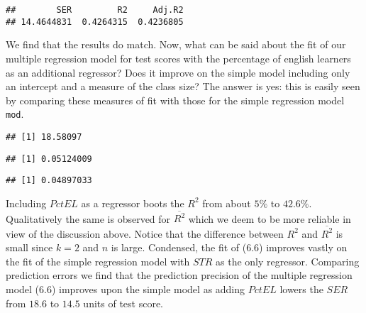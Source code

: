 \documentclass[]{book}
\newenvironment{Shaded}{\begin{snugshade}}{\end{snugshade}}
\newcommand{\KeywordTok}[1]{\textcolor[rgb]{0.13,0.29,0.53}{\textbf{#1}}}
\newcommand{\CommentTok}[1]{\textcolor[rgb]{0.56,0.35,0.01}{\textit{#1}}}
\newcommand{\OperatorTok}[1]{\textcolor[rgb]{0.81,0.36,0.00}{\textbf{#1}}}
\newcommand{\NormalTok}[1]{#1}
\theoremstyle{definition}
\theoremstyle{definition}
\theoremstyle{definition}
\theoremstyle{remark}
\begin{document}
\begin{verbatim}
##        SER         R2     Adj.R2 
## 14.4644831  0.4264315  0.4236805
\end{verbatim}

We find that the results do match. Now, what can be said about the fit
of our multiple regression model for test scores with the percentage of
english learners as an additional regressor? Does it improve on the
simple model including only an intercept and a measure of the class
size? The answer is yes: this is easily seen by comparing these measures
of fit with those for the simple regression model \texttt{mod}.

\begin{Shaded}
\end{Shaded}

\begin{verbatim}
## [1] 18.58097
\end{verbatim}

\begin{Shaded}
\end{Shaded}

\begin{verbatim}
## [1] 0.05124009
\end{verbatim}

\begin{Shaded}
\end{Shaded}

\begin{verbatim}
## [1] 0.04897033
\end{verbatim}

Including \(PctEL\) as a regressor boots the \(R^2\) from about \(5\%\)
to \(42.6\%\). Qualitatively the same is observed for \(\overline{R^2}\)
which we deem to be more reliable in view of the discussion above.
Notice that the difference between \(R^2\) and \(\overline{R^2}\) is
small since \(k=2\) and \(n\) is large. Condensed, the fit of (6.6)
improves vastly on the fit of the simple regression model with \(STR\)
as the only regressor. Comparing prediction errors we find that the
prediction precision of the multiple regression model (6.6) improves
upon the simple model as adding \(PctEL\) lowers the \(SER\) from
\(18.6\) to \(14.5\) units of test score.
\end{document}

